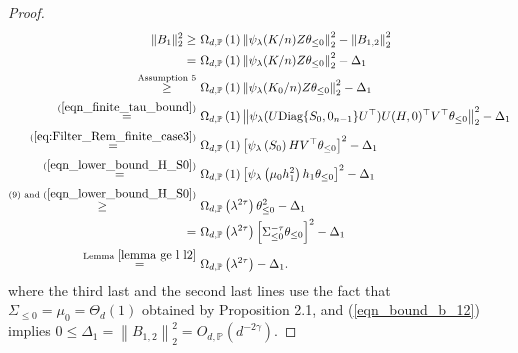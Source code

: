 \documentclass{article}
\theoremstyle{plain}
\theoremstyle{definition}
\theoremstyle{remark}
\newcommand{\rem}{\psi_\lambda}
\newcommand{\dhnote}[1]{{\color{red}[#1]} } %
\begin{document}
\begin{appendix}
\begin{proof}
\begin{equation*}
    \begin{aligned}
        \|B_{1}\|_{2}^{2} \geq &~ \Omega_{d, \mathbb{P}}\left(1\right)\left\| \rem(K/n)
                Z\theta_{\leq 0} \right\|_{2}^{2} - \left\| B_{1, 2} \right\|_{2}^{2}\\
                = &~ \Omega_{d, \mathbb{P}}\left(1\right)\left\| \rem(K/n)
                Z\theta_{\leq 0} \right\|_{2}^{2} - \Delta_1\\
                \overset{\text{Assumption } 5}{\geq} &~
                \Omega_{d, \mathbb{P}}\left(1\right)\left\| \rem(K_{0}/n)
                Z\theta_{\leq 0} \right\|_{2}^{2} - \Delta_1\\
                { \overset{ (\ref{eqn_finite_tau_bound})}{=}}&~
                \Omega_{d, \mathbb{P}}\left(1\right)\left\| \rem(U \text{Diag}\{S_{0}, 0_{n-1} \} U^{\top})
                U (H, 0)^{\top} V^{\top}\theta_{\leq 0} \right\|_{2}^{2} - \Delta_1\\
                { \overset{(\ref{eq:Filter_Rem_finite_case3})}{=}}
        &~\Omega_{d, \mathbb{P}}\left(1\right)\left[ \rem\left(S_0 \right)  H V^{\top}\theta_{\leq 0} \right]^{2}- \Delta_1\\
        { 
        \overset{(\ref{eqn_lower_bound_H_S0})}{=}
        }&~
        \Omega_{d, \mathbb{P}}\left(1\right)\left[ \rem\left(\mu_0 h_1^2 \right)  h_1 \theta_{\leq 0} \right]^{2}- \Delta_1\\
        {
        \overset{(9) \text{ and } (\ref{eqn_lower_bound_H_S0})}{\geq}
        }
        &~
         \Omega_{d, \mathbb{P}}\left(\lambda^{2\tau}\right) \theta_{\leq 0}^{2}- \Delta_1\\
         = &~ \Omega_{d, \mathbb{P}}\left(\lambda^{2\tau}\right) \left[ \Sigma_{\leq 0}^{-\tau}\theta_{\leq 0} \right]^{2}- \Delta_1\\
                \overset{\text{Lemma } \ref{lemma ge l l2}}{=} &~
                \Omega_{d, \mathbb{P}}\left(  \lambda^{2\tau} \right)- \Delta_1.
    \end{aligned}
\end{equation*}
where the third last and the second last lines use the fact that $\Sigma_{\leq 0} = \mu_0 = \Theta_d(1)$ obtained by Proposition 2.1, and (\ref{eqn_bound_b_12}) implies $0 \leq \Delta_1 = \left\| B_{1, 2} \right\|_{2}^{2} = O_{d, \mathbb{P}}\left( d^{-2\gamma }\right)$.




\end{proof}
\end{appendix}
\end{document}
